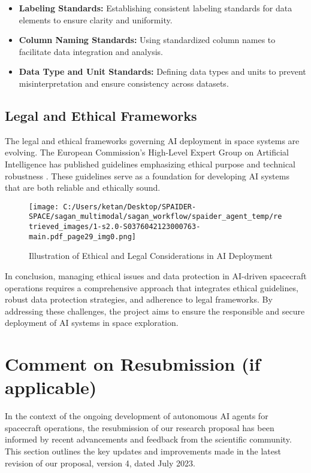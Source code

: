 \documentclass[a4paper,12pt]{article}
\begin{document}
\begin{itemize}
    \item \textbf{Labeling Standards:} Establishing consistent labeling standards for data elements to ensure clarity and uniformity.
    \item \textbf{Column Naming Standards:} Using standardized column names to facilitate data integration and analysis.
    \item \textbf{Data Type and Unit Standards:} Defining data types and units to prevent misinterpretation and ensure consistency across datasets.
\end{itemize}

\subsection{Legal and Ethical Frameworks}

The legal and ethical frameworks governing AI deployment in space systems are evolving. The European Commission's High-Level Expert Group on Artificial Intelligence has published guidelines emphasizing ethical purpose and technical robustness \cite{ec_guidelines_2018}. These guidelines serve as a foundation for developing AI systems that are both reliable and ethically sound.

\begin{figure}[htbp]
    \centering
    \texttt{[image: C:/Users/ketan/Desktop/SPAIDER-SPACE/sagan\_multimodal/sagan\_workflow/spaider\_agent\_temp/retrieved\_images/1-s2.0-S0376042123000763-main.pdf\_page29\_img0.png]}
    \caption{Illustration of Ethical and Legal Considerations in AI Deployment}
    \label{fig:ethical-legal-considerations}
\end{figure}

In conclusion, managing ethical issues and data protection in AI-driven spacecraft operations requires a comprehensive approach that integrates ethical guidelines, robust data protection strategies, and adherence to legal frameworks. By addressing these challenges, the project aims to ensure the responsible and secure deployment of AI systems in space exploration.



\section{Comment on Resubmission (if applicable)}

In the context of the ongoing development of autonomous AI agents for spacecraft operations, the resubmission of our research proposal has been informed by recent advancements and feedback from the scientific community. This section outlines the key updates and improvements made in the latest revision of our proposal, version 4, dated July 2023.
\end{document}
